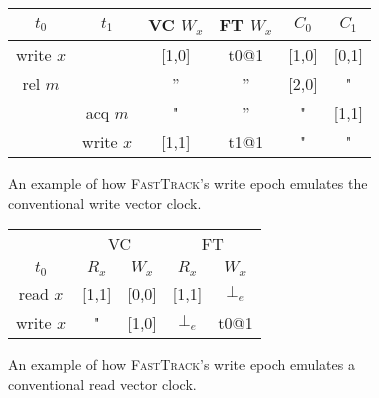 \documentclass[preprint, 10pt]{sigplanconf}
\newcommand{\Tid}{t}
\newcommand{\Address}{x}
\newcommand{\Lock}{m}
\newcommand{\VCFont}{}
\newcommand{\ThreadVC}[1]{\VCFont{C}_{#1}}
\newcommand{\ReadVC}[1]{\VCFont{R}_{#1}}
\newcommand{\WriteVC}[1]{\VCFont{W}_{#1}}
\newcommand{\FT}{\textsc{FastTrack}\xspace}
\newcommand{\EmptyEpoch}{\bot_e}
\begin{document}
\begin{figure}[htb]
\centering


\begin{tabular}{cc|c|c|cc}
$\Tid_0$ & $\Tid_1$ & VC $\WriteVC{\Address}$ & FT $\WriteVC{\Address}$ & $\ThreadVC{0}$ & $\ThreadVC{1}$ \\
\hline
write $\Address$ && [1,0] & t0@1 & [1,0] & [0,1] \\
rel $\Lock$ & &'' &'' & [2,0] & " \\
& acq $\Lock$ & " &'' & " & [1,1] \\
& write $\Address$ & [1,1] & t1@1 & " & " \\
\end{tabular}
\caption{An example of how \FT's write epoch emulates the conventional write vector clock.}
\label{f:encap-writes}
\end{figure}

\begin{figure}[htb]
\centering
\begin{tabular}{c|cc|cc|}
& \multicolumn{2}{c}{VC} & \multicolumn{2}{c}{FT} \\
$\Tid_0$ & $\ReadVC{\Address}$ & $\WriteVC{\Address}$ & $\ReadVC{\Address}$ & $\WriteVC{\Address}$ \\
\hline
read $\Address$ & [1,1] & [0,0] & [1,1] & $\EmptyEpoch$ \\
write $\Address$ & " & [1,0] & $\EmptyEpoch$ & t0@1 \\
\end{tabular}
\caption{An example of how \FT's write epoch emulates a conventional read vector clock.}
\label{f:encap-empty-read}
\end{figure}
\end{document}
